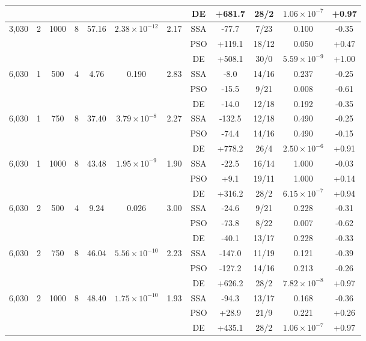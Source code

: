 \begin{table}[!t]
\begin{tabular}{cccccccccccc}
 & & & & & &  & DE & +681.7 & 28/2 & $1.06\times10^{-7}$ & +0.97 \\
\midrule
3,030 & 2 & 1000 & 8 & 57.16 & $2.38\times10^{-12}$ & 2.17 & SSA & -77.7 & 7/23 & 0.100 & -0.35 \\
 & & & & & &  & PSO & +119.1 & 18/12 & 0.050 & +0.47 \\
 & & & & & &  & DE & +508.1 & 30/0 & $5.59\times10^{-9}$ & +1.00 \\
\midrule
6,030 & 1 & 500 & 4 & 4.76 & 0.190 & 2.83 & SSA & -8.0 & 14/16 & 0.237 & -0.25 \\
 & & & & & &  & PSO & -15.5 & 9/21 & 0.008 & -0.61 \\
 & & & & & &  & DE & -14.0 & 12/18 & 0.192 & -0.35 \\
\midrule
6,030 & 1 & 750 & 8 & 37.40 & $3.79\times10^{-8}$ & 2.27 & SSA & -132.5 & 12/18 & 0.490 & -0.25 \\
 & & & & & &  & PSO & -74.4 & 14/16 & 0.490 & -0.15 \\
 & & & & & &  & DE & +778.2 & 26/4 & $2.50\times10^{-6}$ & +0.91 \\
\midrule
6,030 & 1 & 1000 & 8 & 43.48 & $1.95\times10^{-9}$ & 1.90 & SSA & -22.5 & 16/14 & 1.000 & -0.03 \\
 & & & & & &  & PSO & +9.1 & 19/11 & 1.000 & +0.14 \\
 & & & & & &  & DE & +316.2 & 28/2 & $6.15\times10^{-7}$ & +0.94 \\
\midrule
6,030 & 2 & 500 & 4 & 9.24 & 0.026 & 3.00 & SSA & -24.6 & 9/21 & 0.228 & -0.31 \\
 & & & & & &  & PSO & -73.8 & 8/22 & 0.007 & -0.62 \\
 & & & & & &  & DE & -40.1 & 13/17 & 0.228 & -0.33 \\
\midrule
6,030 & 2 & 750 & 8 & 46.04 & $5.56\times10^{-10}$ & 2.23 & SSA & -147.0 & 11/19 & 0.121 & -0.39 \\
 & & & & & &  & PSO & -127.2 & 14/16 & 0.213 & -0.26 \\
 & & & & & &  & DE & +626.2 & 28/2 & $7.82\times10^{-8}$ & +0.97 \\
\midrule
6,030 & 2 & 1000 & 8 & 48.40 & $1.75\times10^{-10}$ & 1.93 & SSA & -94.3 & 13/17 & 0.168 & -0.36 \\
 & & & & & &  & PSO & +28.9 & 21/9 & 0.221 & +0.26 \\
 & & & & & &  & DE & +435.1 & 28/2 & $1.06\times10^{-7}$ & +0.97 \\
\bottomrule
\end{tabular}
\end{table}

